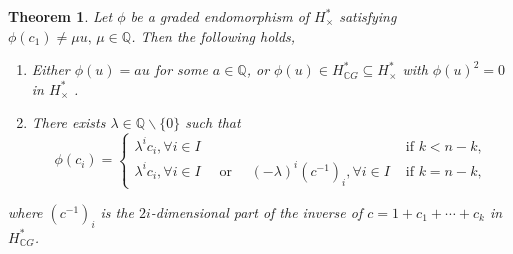 \documentclass{amsart}
\newtheorem{theorem}{Theorem}[section]
\begin{document}
	\begin{theorem}\label{main thm}
		Let $\phi$ be a graded endomorphism of $H^*_{\times}$ satisfying $\phi(c_1) \neq \mu u,\, \mu \in \mathbb{Q}$.  
		Then the following %
holds, \begin{enumerate}
			\item Either $\phi(u)=au$ for some $a \in \mathbb{Q}$, or $\phi(u) \in H^*_{\mathbb{C}G} \subseteq H^*_{\times}$ with $\phi(u)^2=0$ in $H^*_{\times}$%
.
			\item There exists $\lambda \in \mathbb Q\backslash\{0\}$ such that
			$$\phi(c_i) = \begin{cases}
				\lambda^i c_i,   \forall i \in I& \text{ if } k<n-k,\\
				\lambda^i c_i,  \forall i \in I \quad \text{ or } \quad(-\lambda)^i (c^{-1})_i,    \forall i \in I & \text{ if } k= n-k,
			\end{cases}$$
		\end{enumerate} where %
$ (c^{-1})_i $ is the $ 2i $-dimensional part of the inverse of $ c = 1 + c_1 + \cdots + c_k $ in $ H^*_{ \mathbb CG} $.
	\end{theorem}
	
	
\end{document}
